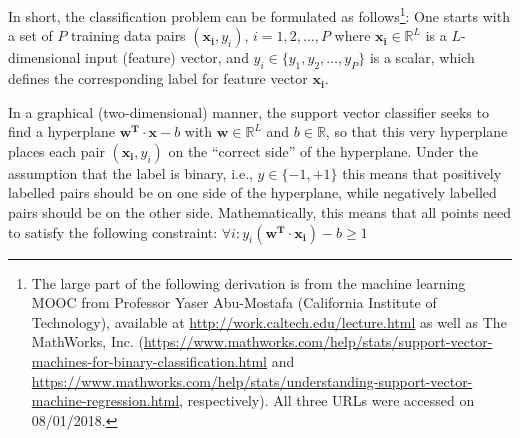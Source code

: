 \begin{enumerate}[(1)]
In short, the classification problem can be formulated as follows\footnote{The large part of the following derivation is from the machine learning MOOC from Professor Yaser Abu-Mostafa (California Institute of Technology), available at \url{http://work.caltech.edu/lecture.html} as well as The MathWorks, Inc. (\url{https://www.mathworks.com/help/stats/support-vector-machines-for-binary-classification.html} and \url{https://www.mathworks.com/help/stats/understanding-support-vector-machine-regression.html}, respectively). All three URLs were accessed on 08/01/2018.}: One starts with a set of $P$ training data pairs $(\mathbf{x_i}, y_i)$, $i = 1, 2, \dots, P$ where $\mathbf{x_i} \in \mathbb{R}^L$ is a $L$-dimensional input (feature) vector, and $y_i \in \{y_1, y_2, \dots, y_P \}$ is a scalar, which defines the corresponding label for feature vector $\mathbf{x_i}$. 

In a graphical (two-dimensional) manner, the support vector classifier seeks to find a hyperplane $\mathbf{w^T} \cdot \mathbf{x} - b$ with $\mathbf{w} \in \mathbb{R}^L$ and $b \in \mathbb{R}$, so that this very hyperplane places each pair $(\mathbf{x_i}, y_i)$ on the \enquote{correct side} of the hyperplane. Under the assumption that the label is binary, i.e., $y \in \{ -1, +1\}$ this means that positively labelled pairs should be on one side of the hyperplane, while negatively labelled pairs should be on the other side. Mathematically, this means that all points need to satisfy the following constraint: $\forall i: y_i (\mathbf{w^T} \cdot \mathbf{x_i}) - b \geq 1$ 


\end{enumerate}
